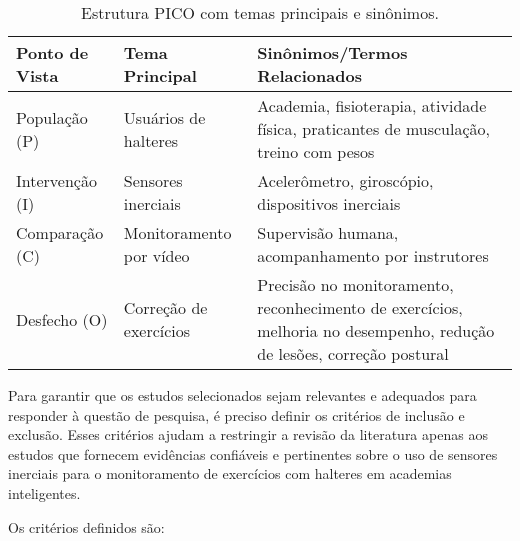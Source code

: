 \documentclass[conference]{IEEEtran}
\begin{document}
\begin{table*}[ht]
\centering
\caption{Estrutura PICO com temas principais e sinônimos.}
\begin{adjustbox}{valign=c, width=\textwidth}
\begin{tabularx}{\textwidth}{|X|X|X|}
\hline
\textbf{Ponto de Vista} & \textbf{Tema Principal} & \textbf{Sinônimos/Termos Relacionados} \\ \hline
População (P)           & Usuários de halteres    & Academia, fisioterapia, atividade física, praticantes de musculação, treino com pesos \\ \hline
Intervenção (I)         & Sensores inerciais      & Acelerômetro, giroscópio, dispositivos inerciais \\ \hline
Comparação (C)          & Monitoramento por vídeo    & Supervisão humana, acompanhamento por instrutores \\ \hline
Desfecho (O)            & Correção de exercícios  & Precisão no monitoramento, reconhecimento de exercícios, melhoria no desempenho, redução de lesões, correção postural \\ \hline
\end{tabularx}
\end{adjustbox}

\label{tab:PICO}
\end{table*}

Para garantir que os estudos selecionados sejam relevantes e adequados para responder à questão de pesquisa, é preciso definir os critérios de inclusão e exclusão. Esses critérios ajudam a restringir a revisão da literatura apenas aos estudos que fornecem evidências confiáveis e pertinentes sobre o uso de sensores inerciais para o monitoramento de exercícios com halteres em academias inteligentes.

Os critérios definidos são:
\end{document}
